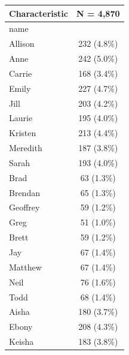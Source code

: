 \documentclass[
  11pt,
]{book}
\numberwithin{equation}{section}
\numberwithin{countremarque}{section}
\begin{document}
\begin{longtable}{lc}
\toprule
\textbf{Characteristic} & \textbf{N = 4,870}\\
\midrule
name & \\
\hspace{1em}Allison & 232 (4.8\%)\\
\hspace{1em}Anne & 242 (5.0\%)\\
\hspace{1em}Carrie & 168 (3.4\%)\\
\hspace{1em}Emily & 227 (4.7\%)\\
\addlinespace
\hspace{1em}Jill & 203 (4.2\%)\\
\hspace{1em}Laurie & 195 (4.0\%)\\
\hspace{1em}Kristen & 213 (4.4\%)\\
\hspace{1em}Meredith & 187 (3.8\%)\\
\hspace{1em}Sarah & 193 (4.0\%)\\
\addlinespace
\hspace{1em}Brad & 63 (1.3\%)\\
\hspace{1em}Brendan & 65 (1.3\%)\\
\hspace{1em}Geoffrey & 59 (1.2\%)\\
\hspace{1em}Greg & 51 (1.0\%)\\
\hspace{1em}Brett & 59 (1.2\%)\\
\addlinespace
\hspace{1em}Jay & 67 (1.4\%)\\
\hspace{1em}Matthew & 67 (1.4\%)\\
\hspace{1em}Neil & 76 (1.6\%)\\
\hspace{1em}Todd & 68 (1.4\%)\\
\hspace{1em}Aisha & 180 (3.7\%)\\
\addlinespace
\hspace{1em}Ebony & 208 (4.3\%)\\
\hspace{1em}Keisha & 183 (3.8\%)\\

\end{longtable}
\end{document}
